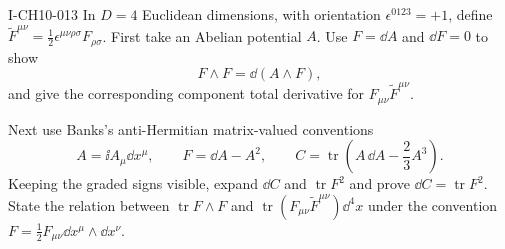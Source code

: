 \begin{exercise}{I-CH10-013}
In $D=4$ Euclidean dimensions, with orientation $\epsilon^{0123}=+1$, define
$\widetilde F^{\mu\nu}=\tfrac12\epsilon^{\mu\nu\rho\sigma}F_{\rho\sigma}$.
First take an Abelian potential $A$.  Use $F=\dd A$ and $\dd F=0$ to show
\[
  F\wedge F=\dd(A\wedge F),
\]
and give the corresponding component total derivative for
$F_{\mu\nu}\widetilde F^{\mu\nu}$.

Next use Banks's anti-Hermitian matrix-valued conventions
\[
  A=\ii A_\mu\dd x^\mu,\qquad F=\dd A-A^2,
  \qquad C=\operatorname{tr}\left(A\,\dd A-\frac23A^3\right).
\]
Keeping the graded signs visible, expand $\dd C$ and
$\operatorname{tr}F^2$ and prove
$\dd C=\operatorname{tr}F^2$.  State the relation between
$\operatorname{tr}F\wedge F$ and
$\operatorname{tr}(F_{\mu\nu}\widetilde F^{\mu\nu})\dd^4x$ under the
convention $F=\tfrac12F_{\mu\nu}\dd x^\mu\wedge\dd x^\nu$.
\end{exercise}
